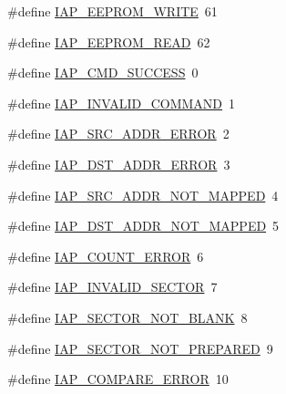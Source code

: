 \begin{DoxyCompactItemize}
\item 
\#define \hyperlink{group___c_o_m_m_o_n___i_a_p_ga76ebaaa7cd2a015246d1a44e3a0cc369}{I\+A\+P\+\_\+\+E\+E\+P\+R\+O\+M\+\_\+\+W\+R\+I\+T\+E}~61
\item 
\#define \hyperlink{group___c_o_m_m_o_n___i_a_p_ga34d721b0a3ff4caf7b847c9d85fe73a0}{I\+A\+P\+\_\+\+E\+E\+P\+R\+O\+M\+\_\+\+R\+E\+A\+D}~62
\item 
\#define \hyperlink{group___c_o_m_m_o_n___i_a_p_ga6855b3bb97689d746eff1f27dde58fc5}{I\+A\+P\+\_\+\+C\+M\+D\+\_\+\+S\+U\+C\+C\+E\+S\+S}~0
\item 
\#define \hyperlink{group___c_o_m_m_o_n___i_a_p_ga78fcc8d4b3835576a272431915e39eb7}{I\+A\+P\+\_\+\+I\+N\+V\+A\+L\+I\+D\+\_\+\+C\+O\+M\+M\+A\+N\+D}~1
\item 
\#define \hyperlink{group___c_o_m_m_o_n___i_a_p_gaad19f900fbc28ee51d3e0138a88a446b}{I\+A\+P\+\_\+\+S\+R\+C\+\_\+\+A\+D\+D\+R\+\_\+\+E\+R\+R\+O\+R}~2
\item 
\#define \hyperlink{group___c_o_m_m_o_n___i_a_p_ga72a13c4c7132aa3da476fc0907cb2a08}{I\+A\+P\+\_\+\+D\+S\+T\+\_\+\+A\+D\+D\+R\+\_\+\+E\+R\+R\+O\+R}~3
\item 
\#define \hyperlink{group___c_o_m_m_o_n___i_a_p_ga8d15cbc501933748afbe786c587e74f9}{I\+A\+P\+\_\+\+S\+R\+C\+\_\+\+A\+D\+D\+R\+\_\+\+N\+O\+T\+\_\+\+M\+A\+P\+P\+E\+D}~4
\item 
\#define \hyperlink{group___c_o_m_m_o_n___i_a_p_gacd5a7fb6c783f5d435e594170757d1d4}{I\+A\+P\+\_\+\+D\+S\+T\+\_\+\+A\+D\+D\+R\+\_\+\+N\+O\+T\+\_\+\+M\+A\+P\+P\+E\+D}~5
\item 
\#define \hyperlink{group___c_o_m_m_o_n___i_a_p_ga719488ff2abf2f325b73a10b20403813}{I\+A\+P\+\_\+\+C\+O\+U\+N\+T\+\_\+\+E\+R\+R\+O\+R}~6
\item 
\#define \hyperlink{group___c_o_m_m_o_n___i_a_p_gab3af925b968fb59823d08d77261aebf7}{I\+A\+P\+\_\+\+I\+N\+V\+A\+L\+I\+D\+\_\+\+S\+E\+C\+T\+O\+R}~7
\item 
\#define \hyperlink{group___c_o_m_m_o_n___i_a_p_ga19b046ec9c03aa0276a9cbe409eb3f04}{I\+A\+P\+\_\+\+S\+E\+C\+T\+O\+R\+\_\+\+N\+O\+T\+\_\+\+B\+L\+A\+N\+K}~8
\item 
\#define \hyperlink{group___c_o_m_m_o_n___i_a_p_ga8600f9e930f1dee5d67a2bc11efcde63}{I\+A\+P\+\_\+\+S\+E\+C\+T\+O\+R\+\_\+\+N\+O\+T\+\_\+\+P\+R\+E\+P\+A\+R\+E\+D}~9
\item 
\#define \hyperlink{group___c_o_m_m_o_n___i_a_p_gabeb57ce3d4009fdee1847f5494376c8d}{I\+A\+P\+\_\+\+C\+O\+M\+P\+A\+R\+E\+\_\+\+E\+R\+R\+O\+R}~10
\item 

\end{DoxyCompactItemize}
